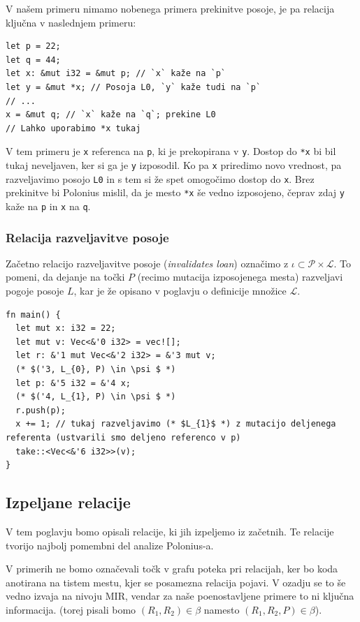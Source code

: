 \documentclass{article}
\begin{document}
V našem primeru nimamo nobenega primera prekinitve posoje, je pa relacija ključna v naslednjem primeru:

\begin{lstlisting}
let p = 22;
let q = 44;
let x: &mut i32 = &mut p; // `x` kaže na `p`
let y = &mut *x; // Posoja L0, `y` kaže tudi na `p`
// ...
x = &mut q; // `x` kaže na `q`; prekine L0
// Lahko uporabimo *x tukaj
\end{lstlisting}

V tem primeru je \verb|x| referenca na \verb|p|, ki je prekopirana v \verb|y|. Dostop do \verb|*x| bi bil tukaj neveljaven,
ker si ga je \verb|y| izposodil. Ko pa \verb|x| priredimo novo vrednost, pa razveljavimo posojo \verb|L0| in s tem si že spet
omogočimo dostop do \verb|x|. Brez prekinitve bi Polonius mislil, da je mesto \verb|*x| še vedno izposojeno, čeprav
zdaj \verb|y| kaže na \verb|p| in \verb|x| na \verb|q|.

\subsubsection{Relacija razveljavitve posoje}

Začetno relacijo razveljavitve posoje (\textit{invalidates loan}) označimo z $\iota \subset \mathcal{P} \times \mathcal{L}$.
To pomeni, da dejanje na točki $P$ (recimo mutacija izposojenega mesta) razveljavi pogoje posoje $L$, kar
je že opisano v poglavju o definicije množice $\mathcal{L}$.

\begin{lstlisting}
fn main() {
  let mut x: i32 = 22;
  let mut v: Vec<&'0 i32> = vec![];
  let r: &'1 mut Vec<&'2 i32> = &'3 mut v; 
  (* $('3, L_{0}, P) \in \psi $ *)
  let p: &'5 i32 = &'4 x; 
  (* $('4, L_{1}, P) \in \psi $ *)
  r.push(p);
  x += 1; // tukaj razveljavimo (* $L_{1}$ *) z mutacijo deljenega referenta (ustvarili smo deljeno referenco v p)
  take::<Vec<&'6 i32>>(v);
}
\end{lstlisting}

\subsection{Izpeljane relacije}

V tem poglavju bomo opisali relacije, ki jih izpeljemo iz začetnih. Te relacije tvorijo najbolj pomembni del analize
Polonius-a.

V primerih ne bomo označevali točk v grafu poteka pri relacijah, ker bo koda anotirana na tistem mestu, kjer
se posamezna relacija pojavi. V ozadju se to še vedno izvaja na nivoju MIR, vendar za naše poenostavljene
primere to ni ključna informacija. (torej pisali bomo $(R_{1}, R_{2}) \in \beta$ namesto $(R_{1}, R_{2}, P) \in \beta$).
\end{document}
